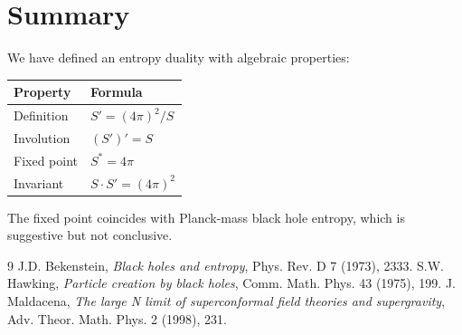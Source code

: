 \documentclass[11pt,a4paper]{article}
\begin{document}
\section{Summary}

We have defined an entropy duality with algebraic properties:
\begin{center}
\begin{tabular}{|l|l|}
\hline
Property & Formula \\
\hline
Definition & $S' = (4\pi)^2/S$ \\
Involution & $(S')' = S$ \\
Fixed point & $S^* = 4\pi$ \\
Invariant & $S \cdot S' = (4\pi)^2$ \\
\hline
\end{tabular}
\end{center}

The fixed point coincides with Planck-mass black hole entropy, which is suggestive but not conclusive.

\begin{thebibliography}{9}
 J.D. Bekenstein, \textit{Black holes and entropy}, Phys. Rev. D 7 (1973), 2333.
 S.W. Hawking, \textit{Particle creation by black holes}, Comm. Math. Phys. 43 (1975), 199.
 J. Maldacena, \textit{The large N limit of superconformal field theories and supergravity}, Adv. Theor. Math. Phys. 2 (1998), 231.
\end{thebibliography}
\end{document}
